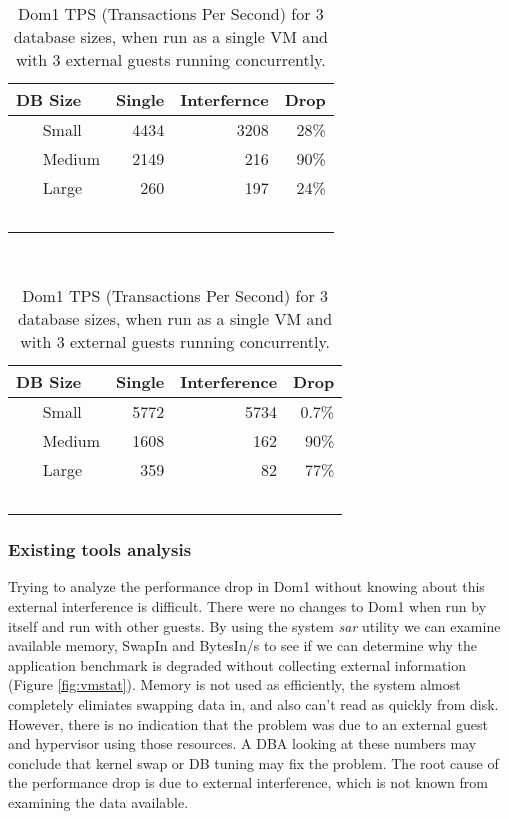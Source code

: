 \begin{table}[h]
\begin{subtable}[h]{0.45\textwidth}
  \begin{tabular}{ l | r | r | r }
    DB Size & Single & Interfernce & Drop \\
    \hline
    Small & 4434 & 3208 & 28\% \\ \hline
    Medium & 2149 & 216 & 90\% \\ \hline
    Large & 260 & 197 & 24\% \\  \hline
    \hline
  \end{tabular}
\caption{IBM x3650 with 2GB RAM:  Each Guest domain has 512MB Allocated.}
\label{fig:tps1}
\end{subtable}
\hfill
\begin{subtable}[h]{0.45\textwidth}
  \begin{tabular}{ l | r | r | r }
    DB Size & Single & Interference & Drop \\
    \hline
    Small & 5772 & 5734 & 0.7\% \\ \hline
    Medium & 1608 & 162 & 90\% \\ \hline
    Large & 359 & 82 & 77\% \\  \hline
    \hline
  \end{tabular}
\caption{Dell T410 with 8GB RAM:  Each Guest domain has 2GB Allocated. }
\label{fig:tps2}
\end{subtable}
\caption{Dom1 TPS (Transactions Per Second) for 3 database sizes, when run as a single VM and with 3 external guests running concurrently.}
\end{table}

\subsubsection{Existing tools analysis}
\indent Trying to analyze the performance drop in Dom1 without knowing about this external interference is difficult.  
There were no changes to Dom1 when run by itself and run with other guests.  
By using the system \emph{sar} utility we can examine available memory, SwapIn and BytesIn/s to see if we can determine why the application benchmark is degraded without collecting external information (Figure \ref{fig:vmstat}).  
Memory is not used as efficiently, the system almost completely elimiates swapping data in, and also can't read as quickly from disk.  
However, there is no indication that the problem was due to an external guest and hypervisor using those resources.
A DBA looking at these numbers may conclude that kernel swap or DB tuning may fix the problem.  
The root cause of the performance drop is due to external interference, which is not known from examining the data available.

